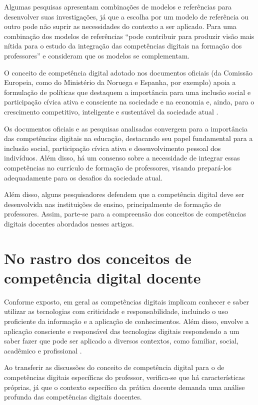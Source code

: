 \documentclass[portuguese]{textolivre}
\begin{document}
Algumas pesquisas apresentam combinações de modelos e referências para
desenvolver suas investigações, já que a escolha por um modelo de
referência ou outro pode não suprir as necessidades do contexto a ser
aplicado. Para \textcite{instefjord2016} uma combinação dos modelos de
referências ``pode contribuir para produzir visão mais nítida para o
estudo da integração das competências digitais na formação dos
professores'' e consideram que os modelos se complementam.

O conceito de competência digital adotado nos documentos oficiais (da
Comissão Europeia, como do Ministério da Noruega e Espanha, por exemplo)
apoia a formulação de políticas que destaquem a importância para uma
inclusão social e participação cívica ativa e consciente na sociedade e
na economia e, ainda, para o crescimento competitivo, inteligente e
sustentável da sociedade atual
\cite{comissaoeuropeia2012}.

Os documentos oficiais e as pesquisas analisadas convergem para a
importância das competências digitais na educação, destacando seu papel
fundamental para a inclusão social, participação cívica ativa e
desenvolvimento pessoal dos indivíduos. Além disso, há um consenso sobre
a necessidade de integrar essas competências no currículo de formação de
professores, visando prepará-los adequadamente para os desafios da
sociedade atual.

Além disso, alguns pesquisadores \cite{fraile2018, escudero2019}
defendem que a competência digital deve ser desenvolvida nas
instituições de ensino, principalmente de formação de professores.
Assim, parte-se para a compreensão dos conceitos de competências
digitais docentes abordados nesses artigos.


\section{No rastro dos conceitos de competência digital
docente}

Conforme exposto, em geral as competências digitais implicam conhecer e
saber utilizar as tecnologias com criticidade e responsabilidade,
incluindo o uso proficiente da informação e a aplicação de
conhecimentos. Além disso, envolve a aplicação consciente e responsável
das tecnologias digitais respondendo a um saber fazer que pode ser
aplicado a diversos contextos, como familiar, social, acadêmico e
profissional \cite{ferrari2013}.

Ao transferir as discussões do conceito de competência digital para o de
competências digitais específicas do professor, verifica-se que há
características próprias, já que o contexto específico da prática
docente demanda uma análise profunda das competências digitais docentes.
\end{document}
